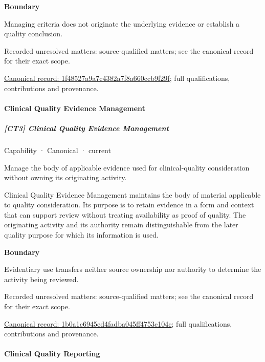 \textbf{Boundary}



Managing criteria does not originate the underlying evidence or establish a quality conclusion.


{\small Recorded unresolved matters: source-qualified matters; see the canonical record for their exact scope.}\par
{\footnotesize \href{../../../../continuum/strategy/capability/1f48527a9a7c4382a7f8a660ccb9f29f.md}{Canonical record: 1f48527a9a7c4382a7f8a660ccb9f29f}; full qualifications, contributions and provenance.}\par
\paragraph{Clinical Quality Evidence Management}

\subparagraph{[CT3] Clinical Quality Evidence Management}

\label{element:1b0a1c6945ed4fadba045ff4753c104c}
{\small Capability · Canonical · current}\par

Manage the body of applicable evidence used for clinical-quality consideration without owning its originating activity.



Clinical Quality Evidence Management maintains the body of material applicable to quality consideration. Its purpose is to retain evidence in a form and context that can support review without treating availability as proof of quality. The originating activity and its authority remain distinguishable from the later quality purpose for which its information is used.



\textbf{Boundary}



Evidentiary use transfers neither source ownership nor authority to determine the activity being reviewed.


{\small Recorded unresolved matters: source-qualified matters; see the canonical record for their exact scope.}\par
{\footnotesize \href{../../../../continuum/strategy/capability/1b0a1c6945ed4fadba045ff4753c104c.md}{Canonical record: 1b0a1c6945ed4fadba045ff4753c104c}; full qualifications, contributions and provenance.}\par
\paragraph{Clinical Quality Reporting}

